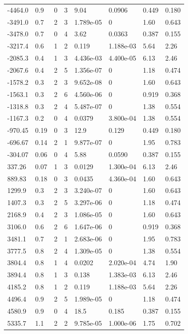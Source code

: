 \documentclass[preview]{standalone}
\begin{document}
{{\begin{tabular}{L{1.2cm}C{1.2cm} C{0.3cm}C{0.5cm} C{1.4cm}C{1.4cm} C{1.4cm}C{1.4cm}}
  -4464.0  &   0.9  & 0     &  3 &  9.04  & 0.0906  & 0.449 &  0.180   \\ 
  -3491.0  &   0.7  & 2     &  3 &  1.789e-05  & 0  & 1.60 &  0.643   \\ 
  -3478.0  &   0.7  & 0     &  4 &  3.62  & 0.0363  & 0.387 &  0.155   \\ 
  -3217.4  &   0.6  & 1     &  2 &  0.119  & 1.188e-03  & 5.64 &  2.26   \\ 
  -2085.3  &   0.4  & 1     &  3 &  4.436e-03  & 4.400e-05  & 6.13 &  2.46   \\ 
  -2067.6  &   0.4  & 2     &  5 &  1.356e-07  & 0  & 1.18 &  0.474   \\ 
  -1578.2  &   0.3  & 2     &  3 &  9.652e-08  & 0  & 1.60 &  0.643   \\ 
  -1563.1  &   0.3  & 2     &  6 &  4.560e-06  & 0  & 0.919 &  0.368   \\ 
  -1318.8  &   0.3  & 2     &  4 &  5.487e-07  & 0  & 1.38 &  0.554   \\ 
  -1167.3  &   0.2  & 0     &  4 &  0.0379  & 3.800e-04  & 1.38 &  0.554   \\ 
  -970.45  &  0.19  & 0     &  3 &  12.9  & 0.129  & 0.449 &  0.180   \\ 
  -696.67  &  0.14  & 2     &  1 &  9.877e-07  & 0  & 1.95 &  0.783   \\ 
  -304.07  &  0.06  & 0     &  4 &  5.88  & 0.0590  & 0.387 &  0.155   \\ 
  337.26  &  0.07  & 1     &  3 &  0.0129  & 1.300e-04  & 6.13 &  2.46   \\ 
  889.83  &  0.18  & 0     &  3 &  0.0435  & 4.360e-04  & 1.60 &  0.643   \\ 
  1299.9  &   0.3  & 2     &  3 &  3.240e-07  & 0  & 1.60 &  0.643   \\ 
  1407.3  &   0.3  & 2     &  5 &  3.297e-06  & 0  & 1.18 &  0.474   \\ 
  2168.9  &   0.4  & 2     &  3 &  1.086e-05  & 0  & 1.60 &  0.643   \\ 
  3106.0  &   0.6  & 2     &  6 &  1.647e-06  & 0  & 0.919 &  0.368   \\ 
  3481.1  &   0.7  & 2     &  1 &  2.683e-06  & 0  & 1.95 &  0.783   \\ 
  3777.5  &   0.8  & 2     &  4 &  1.309e-05  & 0  & 1.38 &  0.554   \\ 
  3804.4  &   0.8  & 1     &  4 &  0.0202  & 2.020e-04  & 4.74 &  1.90   \\ 
  3894.4  &   0.8  & 1     &  3 &  0.138  & 1.383e-03  & 6.13 &  2.46   \\ 
  4185.2  &   0.8  & 1     &  2 &  0.119  & 1.188e-03  & 5.64 &  2.26   \\ 
  4496.4  &   0.9  & 2     &  5 &  1.989e-05  & 0  & 1.18 &  0.474   \\ 
  4580.9  &   0.9  & 0     &  4 &  18.5  & 0.185  & 0.387 &  0.155   \\ 
  5335.7  &   1.1  & 2     &  2 &  9.785e-05  & 1.000e-06  & 1.75 &  0.702   \\ 
\hline 
\end{tabular} 

}}
\end{document}
